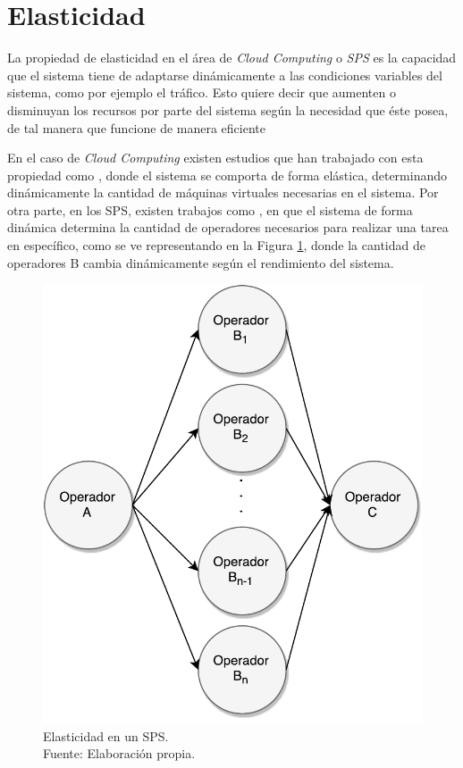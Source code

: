 \section{Elasticidad}
\label{sec:elasticidad}

La propiedad de elasticidad en el \'area de \textit{Cloud Computing} o \textit{SPS} es la capacidad que el sistema tiene de adaptarse din\'amicamente a las condiciones variables del sistema, como por ejemplo el tr\'afico. \normalsize{Esto quiere decir que aumenten o disminuyan los recursos por parte del sistema seg\'un la necesidad que \'este posea, de tal manera que funcione de manera eficiente} \citep{kelly2014elasticity}

En el caso de \textit{Cloud Computing} existen estudios que han trabajado con esta propiedad como \citep{GongGW10, NguyenSGSW13, LehrigEB15}, donde el sistema se comporta de forma el\'astica, determinando din\'amicamente la cantidad de m\'aquinas virtuales necesarias en el sistema. Por otra parte, en los SPS, existen trabajos como \citep{GedikSHW14, IshiiS11, SchneiderAGBW09, MadsenTZ14, GulisanoJPSV12}, en que el sistema de forma din\'amica determina la cantidad de operadores necesarios para realizar una tarea en espec\'ifico, como se ve representando en la Figura \ref{fig:elasticidad}, donde la cantidad de operadores B cambia din\'amicamente seg\'un el rendimiento del sistema.

\begin{figure}[!ht]
	\centering
	\includegraphics[scale=0.55]{images/Elasticidad.pdf}
	\caption[Elasticidad en un SPS.]{Elasticidad en un SPS.\\Fuente: Elaboración propia.}
	\label{fig:elasticidad}
\end{figure}

